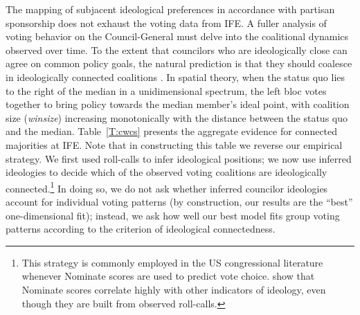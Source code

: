 \documentclass[12 pt, letter]{article}
\begin{document}
The mapping of subjacent ideological preferences in accordance with
partisan sponsorship does not exhaust the voting data from IFE.
A fuller analysis of voting behavior on the Council-General must
delve into the coalitional dynamics observed over time.  To the
extent that councilors who are ideologically close can agree on
common policy goals, the natural prediction is that they should
coalesce in ideologically connected coalitions \citep{Axelrod1970}.
In spatial theory, when the status quo lies to the right of the
median in a unidimensional spectrum, the left bloc votes together to
bring policy towards the median member's ideal point, with coalition
size (\emph{winsize}) increasing monotonically with the distance
between the status quo and the median.  Table~\ref{T:cwcs} presents
the aggregate evidence for connected majorities at IFE.  Note that
in constructing this table we reverse our empirical strategy.  We
first used roll-calls to infer ideological positions; we now use
inferred ideologies to decide which of the observed voting
coalitions are ideologically connected.\footnote{This strategy is
commonly employed in the US congressional literature whenever {\sc
Nominate} scores are used to predict vote choice. \citet{Burden2000}
show that {\sc Nominate} scores correlate highly with other
indicators of ideology, even though they are built from observed
roll-calls.}  In doing so, we do not ask whether inferred councilor
ideologies account for individual voting patterns (by construction,
our results are the ``best'' one-dimensional fit); instead, we ask
how well our best model fits group voting patterns according to the
criterion of ideological connectedness.
\end{document}
